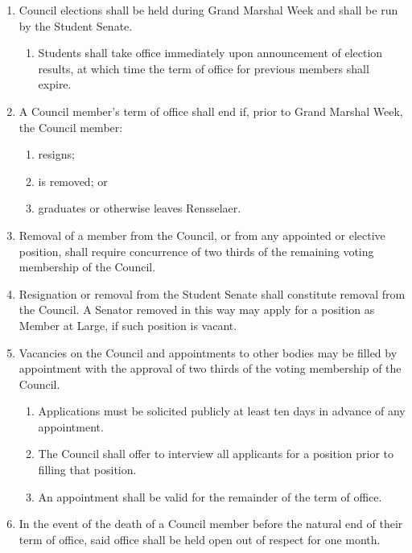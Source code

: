 \begin{enumerate}
\begin{enumerate}
  \end{enumerate}
\end{enumerate}


\begin{enumerate}
\item Council elections shall be held during Grand Marshal Week and shall be run by the Student Senate.
  \begin{enumerate}
  \item Students shall take office immediately upon announcement of election results, at which time the term of office for previous members shall expire.
  \end{enumerate}
\item A Council member's term of office shall end if, prior to Grand Marshal Week, the Council member:
  \begin{enumerate}
  \item resigns;
  \item is removed; or
  \item graduates or otherwise leaves Rensselaer.
  \end{enumerate}
\item Removal of a member from the Council, or from any appointed or elective position, shall require concurrence of two thirds of the remaining voting membership of the Council.
\item Resignation or removal from the Student Senate shall constitute removal from the Council. A Senator removed in this way may apply for a position as Member at Large, if such position is vacant.
\item Vacancies on the Council and appointments to other bodies may be filled by appointment with the approval of two thirds of the voting membership of the Council.
  \begin{enumerate}
  \item Applications must be solicited publicly at least ten days in advance of any appointment.
  \item The Council shall offer to interview all applicants for a position prior to filling that position.
  \item An appointment shall be valid for the remainder of the term of office.
  \end{enumerate}
\item In the event of the death of a Council member before the natural end of their term of office, said office shall be held open out of respect for one month.
\end{enumerate}

